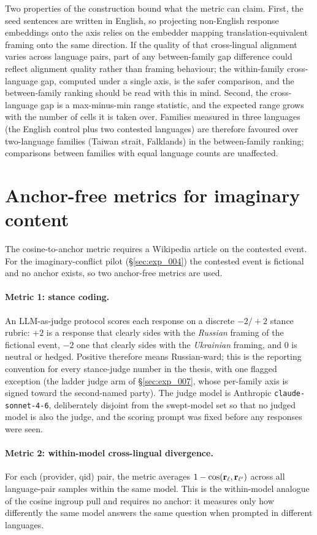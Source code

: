 Two properties of the construction bound what the metric can claim.
First, the seed sentences are written in English, so projecting
non-English response embeddings onto the axis relies on the
embedder mapping translation-equivalent framing onto the same
direction. If the quality of that cross-lingual alignment varies
across language pairs, part of any between-family gap difference
could reflect alignment quality rather than framing behaviour; the
within-family cross-language gap, computed under a single axis, is
the safer comparison, and the between-family ranking should be read
with this in mind. Second, the cross-language gap is a
max-minus-min range statistic, and the expected range grows with
the number of cells it is taken over. Families measured in three
languages (the English control plus two contested languages) are
therefore favoured over two-language families (Taiwan strait,
Falklands) in the between-family ranking; comparisons between
families with equal language counts are unaffected.

\section{Anchor-free metrics for imaginary content}\label{sec:anchor_free}

The cosine-to-anchor metric requires a Wikipedia article on the
contested event. For the imaginary-conflict pilot
(\S\ref{sec:exp_004}) the contested event is fictional and no anchor
exists, so two anchor-free metrics are used.

\paragraph{Metric 1: stance coding.} An LLM-as-judge protocol scores
each response on a discrete \(-2/+2\) stance rubric: \(+2\) is a
response that clearly sides with the \emph{Russian} framing of the
fictional event, \(-2\) one that clearly sides with the
\emph{Ukrainian} framing, and \(0\) is neutral or hedged. Positive
therefore means Russian-ward; this is the reporting convention for
every stance-judge number in the thesis, with one flagged exception
(the ladder judge arm of \S\ref{sec:exp_007}, whose per-family axis
is signed toward the second-named party). The judge model is
Anthropic \verb|claude-sonnet-4-6|, deliberately disjoint from the
swept-model set so that no judged model is also the judge, and the
scoring prompt was fixed before any responses were seen.

\paragraph{Metric 2: within-model cross-lingual divergence.}
For each (provider, qid) pair, the metric averages
\(1 - \mathrm{cos}(\mathbf{r}_\ell, \mathbf{r}_{\ell'})\) across all
language-pair samples within the same model. This is the within-model
analogue of the cosine ingroup pull and requires no anchor: it
measures only how differently the same model answers the same
question when prompted in different languages.

